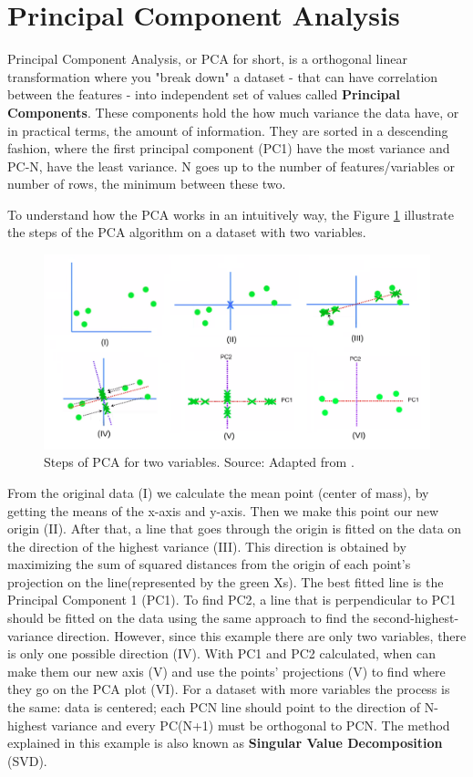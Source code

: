 \section{Principal Component Analysis}

Principal Component Analysis, or PCA for short, is a orthogonal linear transformation \cite{wikipedia_pca} where you "break down" a dataset - that can have correlation between the features - into independent set of values called \textbf{Principal Components}. These components hold the how much variance the data have, or in practical terms, the amount of information. They are sorted in a descending fashion, where the first principal component (PC1) have the most variance and PC-N, have the least variance. N goes up to the number of features/variables or number of rows, the minimum between these two. 

To understand how the PCA works in an intuitively way, the Figure \ref{fig:pca-steps} illustrate the steps of the PCA algorithm on a dataset with two variables.

\begin{figure}[h]
   \centering
   \includegraphics[width=\linewidth]{fig/ch2-pca-steps.png}
   \caption{Steps of PCA for two variables. Source: Adapted from \cite{pcastepsyoutube}.}
   \label{fig:pca-steps}
\end{figure}

From the original data (I) we calculate the mean point (center of mass), by getting the means of the x-axis and y-axis. Then we make this point our new origin (II). After that, a line that goes through the origin is fitted on the data on the direction of the highest variance (III). This direction is obtained by maximizing the sum of squared distances from the origin of each point's projection on the line(represented by the green Xs). The best fitted line is the Principal Component 1 (PC1). To find PC2, a line that is perpendicular to PC1 should be fitted on the data using the same approach to find the second-highest-variance direction. However, since this example there are only two variables, there is only one possible direction (IV). With PC1 and PC2 calculated, when can make them our new axis (V) and use the points' projections (V) to find where they go on the PCA plot (VI). For a dataset with more variables the process is the same: data is centered; each PCN line should point to the direction of N-highest variance and every PC(N+1) must be orthogonal to PCN. The method explained in this example is also known as \textbf{Singular Value Decomposition} (SVD).

